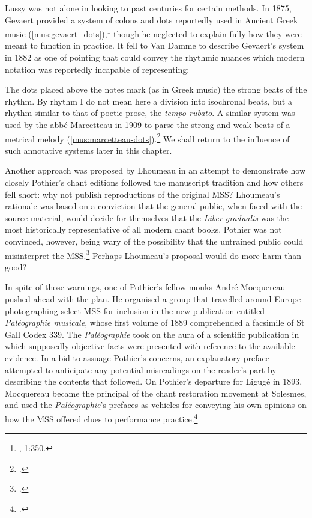 \label{sc:gevaert_dots}%
Lussy was not alone in looking to past centuries for certain methods.
In 1875, Gevaert provided a system of colons and dots reportedly used in Ancient Greek music (\cref{mus:gevaert_dots}),\footnote{\cite{GevaertHistoiretheoriemusique1875}, 1:350.} though he neglected to explain fully how they were meant to function in practice.
It fell to Van Damme to describe Gevaert's system in 1882 as one of pointing that could convey the rhythmic nuances which modern notation was reportedly incapable of representing:

  {\cite[p.~83, n.~1]{VanDammeaccompagnementplainchant1882}}
{The dots placed above the notes mark (as in Greek music) the strong beats of the rhythm. By rhythm I do not mean here a division into isochronal beats, but a rhythm similar to that of poetic prose, the \emph{tempo rubato}.}
\noindent
A similar system was used by the abbé Marcetteau in 1909 to parse the strong and weak beats of a metrical melody (\cref{mus:marcetteau-dots}).\footcite[26]{Marcetteaulogiquerythmemusical1909}
We shall return to the influence of such annotative systems later in this chapter.

Another approach was proposed by Lhoumeau in an attempt to demonstrate how closely Pothier's chant editions followed the manuscript tradition and how others fell short: why not publish reproductions of the original MSS?
Lhoumeau's rationale was based on a conviction that the general public, when faced with the source material, would decide for themselves that the \emph{Liber gradualis} was the most historically representative of all modern chant books.
Pothier was not convinced, however, being wary of the possibility that the untrained public could misinterpret the MSS.\footcites[130--31]{CombeHistoirerestaurationchant1969}[110--111]{CombeRestorationGregorianChant2003}
Perhaps Lhoumeau's proposal would do more harm than good?

In spite of those warnings, one of Pothier's fellow monks André Mocquereau pushed ahead with the plan.
He organised a group that travelled around Europe photographing select MSS for inclusion in the new publication entitled \emph{Paléographie musicale}, whose first volume of 1889 comprehended a facsimile of St Gall Codex 339.
The \emph{Paléographie} took on the aura of a scientific publication in which supposedly objective facts were presented with reference to the available evidence.
In a bid to assuage Pothier's concerns, an explanatory preface attempted to anticipate any potential misreadings on the reader's part by describing the contents that followed.
On Pothier's departure for Ligugé in 1893, Mocquereau became the principal of the chant restoration movement at Solesmes, and used the \emph{Paléographie}'s prefaces as vehicles for conveying his own opinions on how the MSS offered clues to performance practice.\footcites[14--15]{WaldenDomMocquereauTheories2015}[63--8]{BergeronDecadentEnchantmentsRevival1998}

